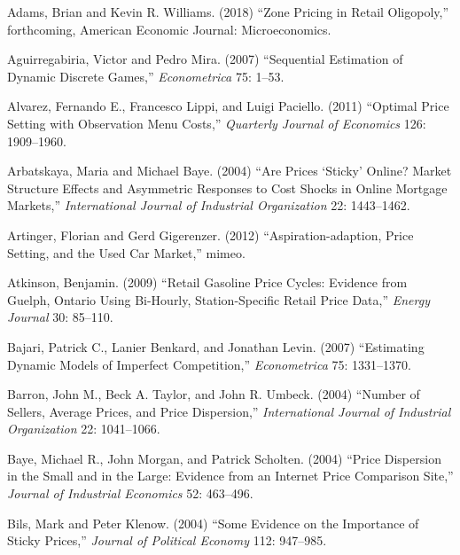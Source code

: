 \documentclass[11pt]{article}
\begin{document}
\begin{description}

\frenchspacing

\item Adams, Brian and Kevin R. Williams. (2018) ``Zone Pricing in Retail Oligopoly,'' forthcoming, American Economic Journal: Microeconomics.

\item Aguirregabiria, Victor and Pedro Mira. (2007) ``Sequential
  Estimation of Dynamic Discrete Games,'' {\it Econometrica} 75:
  1--53.

\item Alvarez, Fernando E., Francesco Lippi, and Luigi
  Paciello. (2011) ``Optimal Price Setting with Observation Menu
  Costs,'' {\it Quarterly Journal of Economics} 126: 1909--1960.

\item Arbatskaya, Maria and Michael Baye. (2004) ``Are Prices `Sticky'
  Online?  Market Structure Effects and Asymmetric Responses to Cost
  Shocks in Online Mortgage Markets,'' {\it International Journal of
    Industrial Organization} 22: 1443--1462.

\item Artinger, Florian and Gerd Gigerenzer. (2012)
  ``Aspiration-adaption, Price Setting, and the Used Car Market,''
  mimeo.

\item Atkinson, Benjamin. (2009) ``Retail Gasoline Price Cycles:
  Evidence from Guelph, Ontario Using Bi-Hourly, Station-Specific
  Retail Price Data,'' {\em Energy Journal} 30: 85--110.

\item Bajari, Patrick C., Lanier Benkard, and Jonathan Levin. (2007)
  ``Estimating Dynamic Models of Imperfect Competition,'' {\it
  Econometrica} 75: 1331--1370.

\item Barron, John M., Beck A. Taylor, and John R. Umbeck. (2004)
  ``Number of Sellers, Average Prices, and Price Dispersion,'' {\it
  International Journal of Industrial Organization} 22: 1041--1066.

\item Baye, Michael R., John Morgan, and Patrick Scholten. (2004)
  ``Price Dispersion in the Small and in the Large: Evidence from an
  Internet Price Comparison Site,'' {\it Journal of Industrial
    Economics} 52: 463--496.

\item Bils, Mark and Peter Klenow. (2004) ``Some Evidence on the
  Importance of Sticky Prices,'' {\it Journal of Political Economy}
  112: 947--985.


\end{description}
\end{document}
